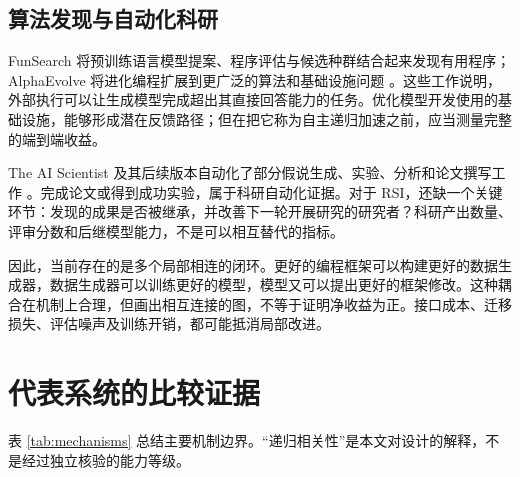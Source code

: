 \documentclass[11pt,,]{article}
\begin{document}
\hypertarget{ux7b97ux6cd5ux53d1ux73b0ux4e0eux81eaux52a8ux5316ux79d1ux7814}{%
\subsection{算法发现与自动化科研}\label{ux7b97ux6cd5ux53d1ux73b0ux4e0eux81eaux52a8ux5316ux79d1ux7814}}

FunSearch
将预训练语言模型提案、程序评估与候选种群结合起来发现有用程序；AlphaEvolve
将进化编程扩展到更广泛的算法和基础设施问题
\citep{funsearch2024, alphaevolve2025}。这些工作说明，外部执行可以让生成模型完成超出其直接回答能力的任务。优化模型开发使用的基础设施，能够形成潜在反馈路径；但在把它称为自主递归加速之前，应当测量完整的端到端收益。

The AI Scientist
及其后续版本自动化了部分假说生成、实验、分析和论文撰写工作
\citep{scientist2024, scientistv22025}。完成论文或得到成功实验，属于科研自动化证据。对于
RSI，还缺一个关键环节：发现的成果是否被继承，并改善下一轮开展研究的研究者？科研产出数量、评审分数和后继模型能力，不是可以相互替代的指标。

因此，当前存在的是多个局部相连的闭环。更好的编程框架可以构建更好的数据生成器，数据生成器可以训练更好的模型，模型又可以提出更好的框架修改。这种耦合在机制上合理，但画出相互连接的图，不等于证明净收益为正。接口成本、迁移损失、评估噪声及训练开销，都可能抵消局部改进。

\hypertarget{ux4ee3ux8868ux7cfbux7edfux7684ux6bd4ux8f83ux8bc1ux636e}{%
\section{代表系统的比较证据}\label{ux4ee3ux8868ux7cfbux7edfux7684ux6bd4ux8f83ux8bc1ux636e}}

表 \ref{tab:mechanisms}
总结主要机制边界。``递归相关性''是本文对设计的解释，不是经过独立核验的能力等级。
\end{document}
